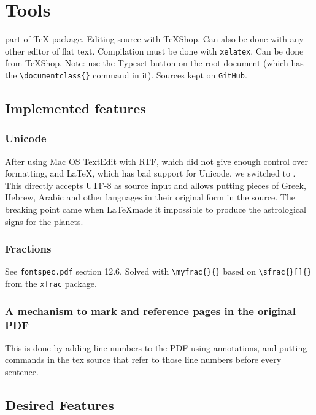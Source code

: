 \documentclass{report}
\begin{document}
\chapter{Tools}
\XeLaTeX{} part of \TeX{} package. Editing source with TeXShop. Can also
be done with any other editor of flat text. 
Compilation must be done with \texttt{xelatex}. Can be done from TeXShop.
Note: use the Typeset button on the root document
(which has the \verb;\documentclass{}; command in it).
Sources kept on \texttt{GitHub}.

\section{Implemented features}
\subsection{Unicode}
After using Mac OS TextEdit with RTF, which did not give enough control over formatting, and \LaTeX, which
has bad support for Unicode, we switched to \XeLaTeX. This directly accepts UTF-8 as source input and allows
putting pieces of Greek, Hebrew, Arabic and other languages in their original form in the source. The breaking point
came when \LaTeX  made it impossible to produce the astrological signs for the planets.

\subsection{Fractions}
See \texttt{fontspec.pdf} section 12.6.
Solved with \verb+\myfrac{}{}+ based on \verb+\sfrac{}[]{}+
from the \verb+xfrac+ package.

\subsection{A mechanism to mark and reference pages in the original PDF}
This is done by adding line numbers to the PDF using annotations, and
putting commands in the tex source that refer to those
line numbers before every sentence.


\section{Desired Features}
\end{document}
